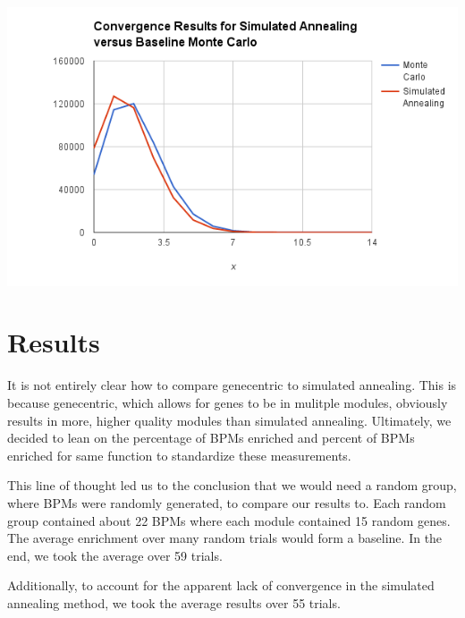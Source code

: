 \documentclass[11pt]{article}
\begin{document}
\includegraphics[scale=0.8]{convergence.png}

\section{Results}

\par It is not entirely clear how to compare genecentric to simulated annealing. This is because genecentric, which allows for genes to be in mulitple modules, obviously results in more, higher quality modules than simulated annealing. Ultimately, we decided to lean on the percentage of BPMs enriched and percent of BPMs enriched for same function to standardize these measurements. 

\par This line of thought led us to the conclusion that we would need a random group, where BPMs were randomly generated, to compare our results to. Each random group contained about 22 BPMs where each module contained 15 random genes. The average enrichment over many random trials would form a baseline. In the end, we took the average over 59 trials.

\par Additionally, to account for the apparent lack of convergence in the simulated annealing method, we took the average results over 55 trials.
\end{document}
